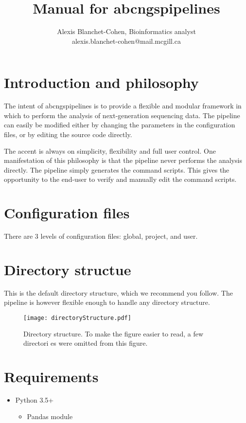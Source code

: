 \documentclass[12pt]{article}
\title{ Manual for abcngspipelines }
\author{ Alexis Blanchet-Cohen, Bioinformatics analyst \\ alexis.blanchet-cohen@mail.mcgill.ca}
\begin{document}
\maketitle
\thispagestyle{empty} %

\newpage
\tableofcontents
\newpage

\section{Introduction and philosophy}

The intent of abcngspipelines is to provide a flexible and modular framework in which to perform the analysis of next-generation sequencing data.
The pipeline can easily be modified either by changing the parameters in the configuration files, or by editing the source code directly.

The accent is always on simplicity, flexibility and full user control.
One manifestation of this philosophy is that the pipeline never performs the analysis directly. The pipeline simply generates the command scripts. This gives the opportunity to the end-user to verify and manually edit the command scripts.

\section{Configuration files}
There are 3 levels of configuration files: global, project, and user.

\section{Directory structue}
This is the default directory structure, which we recommend you follow.
The pipeline is however flexible enough to handle any directory structure.

\begin{figure}[htb]
\centering
\texttt{[image: directoryStructure.pdf]}
\caption{Directory structure. To make the figure easier to read, a few directori
es were omitted from this figure.}
\label{figure:directory_structure}
\end{figure}

\section{Requirements}
\begin{itemize}
    \item{Python 3.5+}
    \begin{itemize}
	\item{Pandas module}
    \end{itemize}
\end{itemize}

\clearpage


\end{document}
